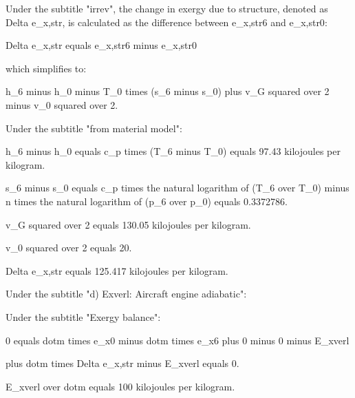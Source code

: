 Under the subtitle "irrev", the change in exergy due to structure, denoted as Delta e_{x,str}, is calculated as the difference between e_{x,str6} and e_{x,str0}:

Delta e_{x,str} equals e_{x,str6} minus e_{x,str0}

which simplifies to:

h_6 minus h_0 minus T_0 times (s_6 minus s_0) plus v_{G} squared over 2 minus v_{0} squared over 2.

Under the subtitle "from material model":

h_6 minus h_0 equals c_p times (T_6 minus T_0) equals 97.43 kilojoules per kilogram.

s_6 minus s_0 equals c_p times the natural logarithm of (T_6 over T_0) minus n times the natural logarithm of (p_6 over p_0) equals 0.3372786.

v_{G} squared over 2 equals 130.05 kilojoules per kilogram.

v_{0} squared over 2 equals 20.

Delta e_{x,str} equals 125.417 kilojoules per kilogram.

Under the subtitle "d) Exverl: Aircraft engine adiabatic":

Under the subtitle "Exergy balance":

0 equals dot{m} times e_{x0} minus dot{m} times e_{x6} plus 0 minus 0 minus E_{xverl}

plus dot{m} times Delta e_{x,str} minus E_{xverl} equals 0.

E_{xverl} over dot{m} equals 100 kilojoules per kilogram.